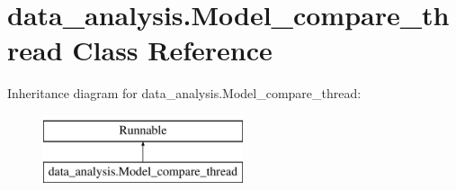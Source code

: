 \hypertarget{classdata__analysis_1_1_model__compare__thread}{}\section{data\+\_\+analysis.\+Model\+\_\+compare\+\_\+thread Class Reference}
\label{classdata__analysis_1_1_model__compare__thread}
Inheritance diagram for data\+\_\+analysis.\+Model\+\_\+compare\+\_\+thread\+:\begin{figure}[H]
\begin{center}
\leavevmode
\includegraphics[height=2.000000cm]{classdata__analysis_1_1_model__compare__thread}
\end{center}
\end{figure}
